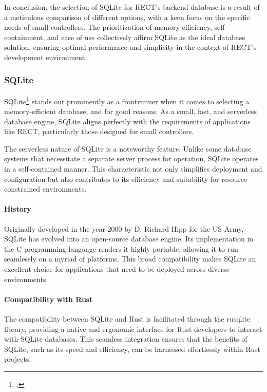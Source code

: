 In conclusion, the selection of SQLite for RECT's backend database is a result of a meticulous comparison of different options, with a keen focus on the 
specific needs of small controllers. The prioritization of memory efficiency, self-containment, and ease of use collectively affirm SQLite as the ideal database 
solution, ensuring optimal performance and simplicity in the context of RECT's development environment.

\subsubsection{SQLite}
SQLite\footcite{sqlite} stands out prominently as a frontrunner when it comes to selecting a memory-efficient database, and for good reasons. As a small, fast, 
and serverless database engine, SQLite aligns perfectly with the requirements of applications like RECT, particularly those designed for small controllers.\newline

The serverless nature of SQLite is a noteworthy feature. Unlike some database systems that necessitate a separate server process for operation, SQLite operates 
in a self-contained manner. This characteristic not only simplifies deployment and configuration but also contributes to its efficiency and suitability for 
resource-constrained environments.\newline

\paragraph{History}
Originally developed in the year 2000 by D. Richard Hipp for the US Army, SQLite has evolved into an open-source database engine. Its implementation in the C 
programming language renders it highly portable, allowing it to run seamlessly on a myriad of platforms. This broad compatibility makes SQLite an excellent 
choice for applications that need to be deployed across diverse environments.\newline

\paragraph{Compatibility with Rust}
The compatibility between SQLite and Rust is facilitated through the rusqlite library, providing a native and ergonomic interface for Rust developers to 
interact with SQLite databases. This seamless integration ensures that the benefits of SQLite, such as its speed and efficiency, can be harnessed effortlessly 
within Rust projects.\newline

